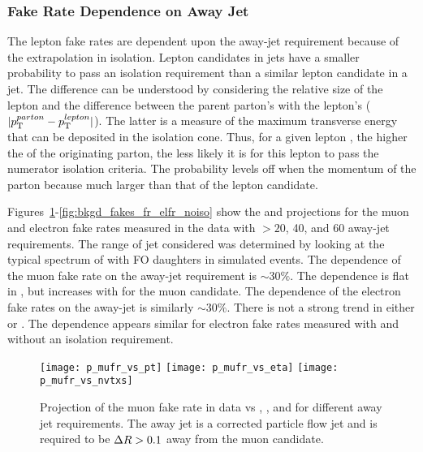 \subsubsection{Fake Rate Dependence on Away Jet \pt}
\label {sec:bkgd_fakes_frstudy_aj}
The lepton fake rates are dependent upon the away-jet requirement because
of the extrapolation in isolation. Lepton candidates in \hpt jets have a
smaller probability to pass an isolation requirement than a similar \pt lepton
candidate in a \lpt jet. The difference can be understood by considering the
relative size of the lepton \pt and the difference between the parent parton's
\pt with the lepton's \pt ($|p_{\mathrm{T}}^{parton} - p_{\mathrm{T}}^{lepton}|$). The latter is a
measure of the maximum transverse energy that can be deposited in the isolation
cone. Thus, for a given lepton \pt, the higher the \pt of the originating
parton, the less likely it is for this lepton to pass the numerator isolation
criteria. The probability levels off when the momentum of the parton because
much larger than that of the lepton candidate.

Figures~\ref{fig:bkgd_fakes_fr_mufr}-\ref{fig:bkgd_fakes_fr_elfr_noiso} show
the \aeta and \pt projections for the muon and electron fake rates measured in
the data with \pt $>20$, 40, and 60 \GeV away-jet requirements. The range of
jet \pt considered was determined by looking at the typical \pt spectrum of
\bqs with FO daughters in simulated \ttbar events. The dependence of the muon
fake rate on the away-jet \pt requirement is $\sim 30\%$. The dependence is
flat in \aeta, but increases with \pt for the muon candidate. The dependence of
the electron fake rates on the away-jet \pt is similarly $\sim 30\%$. There is
not a strong trend in either \aeta or \pt. The dependence appears similar for
electron fake rates measured with and without an isolation requirement.

\begin{figure}[!hbt]
\begin{center}
\texttt{[image: p\_mufr\_vs\_pt]}
\texttt{[image: p\_mufr\_vs\_eta]}
\texttt{[image: p\_mufr\_vs\_nvtxs]}
\caption[Muon Fake Rate vs \pt, \aeta, and number of vertices for different away jet \pt requirements]
{\label{fig:bkgd_fakes_fr_mufr}
Projection of the muon fake rate in data vs \aeta, \pt, and \nvtx for different
away jet \pt requirements. The away jet is a corrected particle flow jet and is
required to be $\Delta R > 0.1$ away from the muon candidate.
}
\end{center}
\end{figure}

